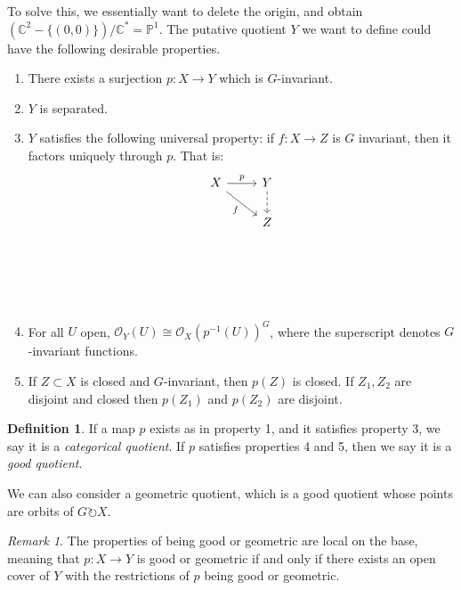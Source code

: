 \documentclass{article}
\theoremstyle{definition}
\newtheorem{definition}[theorem]{Definition}
\theoremstyle{remark}
\newtheorem{remark}[theorem]{Remark}
\numberwithin{theorem}{section}
\newcommand{\C}{\mathbb{C}}
\newcommand{\bP}{\mathbb{P}}
\newcommand{\OO}{\mathcal{O}}
\newenvironment{defn}{
	\begin{mdframed}
		\vspace{-0.5em}
		\begin{definition}
		}{
		\end{definition}
	\end{mdframed}
}
\begin{document}
To solve this, we essentially want to delete the origin, and obtain $\left(\C^2 - \{(0,0)\}\right)/\C^\ast = \bP^1$. The putative quotient $Y$ we want to define could have the following desirable properties.
\begin{enumerate}
	\item There exists a surjection $p:X\to Y$ which is $G$-invariant.
	\item $Y$ is separated.
	\item $Y$ satisfies the following universal property: if $f:X\to Z$ is $G$ invariant, then it factors uniquely through $p$. That is:
	\[\begin{tikzcd}
		X & Y \\
		& Z \\
		\\
		\\
		& {}
		\arrow["p", from=1-1, to=1-2]
		\arrow["f"', from=1-1, to=2-2]
		\arrow[dashed, from=1-2, to=2-2]
	\end{tikzcd}\] 
	\item For all $U$ open, $\OO_Y(U) \cong \OO_X(p^{-1}(U))^G$, where the superscript denotes $G$-invariant functions.
	\item If $Z\subset X$ is closed and $G$-invariant, then $p(Z)$ is closed. If $Z_1, Z_2$ are disjoint and closed then $p(Z_1)$ and $p(Z_2)$ are disjoint.
\end{enumerate}
\begin{defn}
	If a map $p$ exists as in property 1, and it satisfies property 3, we say it is a \emph{categorical quotient}. If $p$ satisfies properties 4 and 5, then we say it is a \emph{good quotient}.
\end{defn}
We can also consider a geometric quotient, which is a good quotient whose points are orbits of $G\circlearrowright X$. 

\begin{remark}
	The properties of being good or geometric are local on the base, meaning that $p:X\to Y$ is good or geometric if and only if there exists an open cover of $Y$ with the restrictions of $p$ being good or geometric.
\end{remark}
\end{document}
